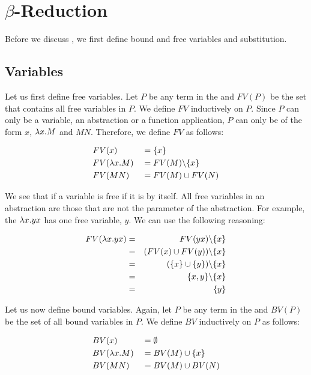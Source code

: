 \section{\texorpdfstring{\boldmath${\beta}$-Reduction}{Beta Reduction}}
Before we discuss \br, we first define bound and free variables and substitution.

\subsection{Variables}
Let us first define free variables. 
Let $P$ be any term in the \lc and $FV(P)$ be the set that contains all free variables in $P$. We define $FV$ inductively on $P$.
Since $P$ can only be a variable, an abstraction or a function application, $P$ can only be of the form $x$, $\lambda {x}.{M}$ and $M N$.
Therefore, we define $FV$ as follows:

\[
\begin{aligned}
	& FV(x)           & &= \{x\} \\
	& FV(\lambda {x}.{M}) & &= FV(M) \backslash \{x\} \\
	& FV(M N)         & &= FV(M) \cup FV(N)
\end{aligned}
\]

We see that if a variable is free if it is by itself. All free variables in an abstraction are those that are not the parameter of the abstraction.
For example, the \lterm $\lambda {x}.{yx}$ has one free variable, $y$. We can use the following reasoning:

\begin{eqnarray*}
	FV(\lambda {x}.{yx}) &=& FV(y x) \backslash \{x\} \\
	&=& (FV(x) \cup FV(y)) \backslash \{x\} \\
	&=& (\{x\} \cup \{y\}) \backslash \{x\} \\
	&=& \{x, y\} \backslash \{x\} \\
	&=& \{y\}
\end{eqnarray*}

Let us now define bound variables. Again, let $P$ be any term in the \lc and $BV(P)$ be the set of all bound variables in $P$. 
We define $BV$ inductively on $P$ as follows:

\[
\begin{aligned}
	& BV(x)           & &= \emptyset \\
	& BV(\lambda {x}.{M}) & &= BV(M) \cup \{x\} \\
	& BV(M N)         & &= BV(M) \cup BV(N)
\end{aligned}
\]

